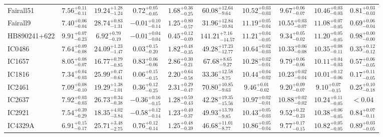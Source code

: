 \documentclass[onecolumn]{mn2e}
\begin{document}
\begin{landscape}
{\begin{center}
\begin{longtable}{lccccccccc}
Fairall51 & $7.56_{-0.11}^{+0.11}$ & $19.24_{-1.24}^{+1.28}$ & $0.72_{-0.05}^{+0.05}$ & $1.68_{-0.25}^{+0.36}$ &$60.08_{-9.64}^{+12.64}$ & $10.52_{-0.03}^{+0.03}$ & $9.67_{-0.07}^{+0.06}$ & $10.46_{-0.03}^{+0.03}$ & $0.81_{-0.03}^{+0.03}$ \\
Fairall9 & $7.40_{-0.04}^{+0.06}$ & $28.74_{-1.31}^{+0.83}$ & $-0.01_{-0.14}^{+0.10}$ & $1.25_{-0.57}^{+0.80}$ &$31.96_{-10.84}^{+12.84}$ & $11.19_{-0.04}^{+0.05}$ & $10.55_{-0.07}^{+0.03}$ & $11.08_{-0.05}^{+0.07}$ & $0.69_{-0.04}^{+0.06}$ \\
HB890241+622 & $9.91_{-0.23}^{+0.07}$ & $6.92_{-0.19}^{+0.70}$ & $-0.01_{-0.04}^{+0.04}$ & $0.45_{-0.09}^{+0.12}$ &$141.21_{-14.57}^{+7.16}$ & $11.21_{-0.05}^{+0.04}$ & $9.34_{-0.02}^{+0.05}$ & $11.20_{-0.05}^{+0.05}$ & $0.98_{-0.00}^{+0.00}$ \\
IC0486 & $7.64_{-0.08}^{+0.09}$ & $24.09_{-1.47}^{+1.23}$ & $0.03_{-0.20}^{+0.15}$ & $1.82_{-0.35}^{+0.48}$ &$49.28_{-12.77}^{+17.23}$ & $10.64_{-0.03}^{+0.02}$ & $10.33_{-0.08}^{+0.06}$ & $10.35_{-0.11}^{+0.08}$ & $0.35_{-0.12}^{+0.12}$ \\
IC1657 & $8.05_{-0.07}^{+0.08}$ & $16.77_{-0.85}^{+0.79}$ & $0.83_{-0.06}^{+0.06}$ & $2.86_{-0.21}^{+0.30}$ &$67.68_{-9.27}^{+8.65}$ & $10.28_{-0.01}^{+0.02}$ & $9.79_{-0.06}^{+0.06}$ & $10.11_{-0.03}^{+0.04}$ & $0.57_{-0.05}^{+0.06}$ \\
IC1816 & $7.34_{-0.03}^{+0.04}$ & $25.99_{-0.61}^{+0.47}$ & $0.06_{-0.15}^{+0.15}$ & $2.20_{-0.58}^{+0.64}$ &$33.36_{-8.75}^{+12.58}$ & $10.44_{-0.02}^{+0.04}$ & $10.23_{-0.04}^{+0.02}$ & $10.01_{-0.06}^{+0.12}$ & $0.17_{-0.05}^{+0.11}$ \\
IC2461 & $7.09_{-0.10}^{+0.08}$ & $19.29_{-1.01}^{+1.38}$ & $0.36_{-0.25}^{+0.12}$ & $2.31_{-0.47}^{+0.29}$ &$70.80_{-9.63}^{+10.85}$ & $9.46_{-0.02}^{+0.01}$ & $9.20_{-0.07}^{+0.09}$ & $9.10_{-0.15}^{+0.07}$ & $0.25_{-0.18}^{+0.10}$ \\
IC2637 & $7.92_{-0.03}^{+0.03}$ & $26.73_{-0.38}^{+0.34}$ & $-0.36_{-0.15}^{+0.16}$ & $1.28_{-0.43}^{+0.59}$ &$42.28_{-15.56}^{+19.35}$ & $10.97_{-0.01}^{+0.02}$ & $10.88_{-0.02}^{+0.02}$ & $10.24_{-0.05}^{+0.11}$ & $<0.04$ \\
IC2921 & $7.54_{-0.29}^{+0.39}$ & $18.35_{-3.84}^{+4.02}$ & $-0.58_{-0.14}^{+0.12}$ & $1.23_{-0.37}^{+0.40}$ &$49.93_{-9.85}^{+13.70}$ & $10.43_{-0.03}^{+0.05}$ & $9.52_{-0.23}^{+0.22}$ & $10.38_{-0.05}^{+0.06}$ & $0.84_{-0.11}^{+0.07}$ \\
IC4329A & $6.91_{-0.17}^{+0.15}$ & $25.71_{-2.75}^{+3.48}$ & $0.76_{-0.14}^{+0.12}$ & $1.25_{-0.39}^{+0.48}$ &$46.68_{-8.77}^{+11.01}$ & $10.86_{-0.04}^{+0.05}$ & $9.77_{-0.15}^{+0.17}$ & $10.82_{-0.05}^{+0.05}$ & $0.89_{-0.05}^{+0.03}$ \\

\end{longtable}
\end{center}}
\end{landscape}
\end{document}
